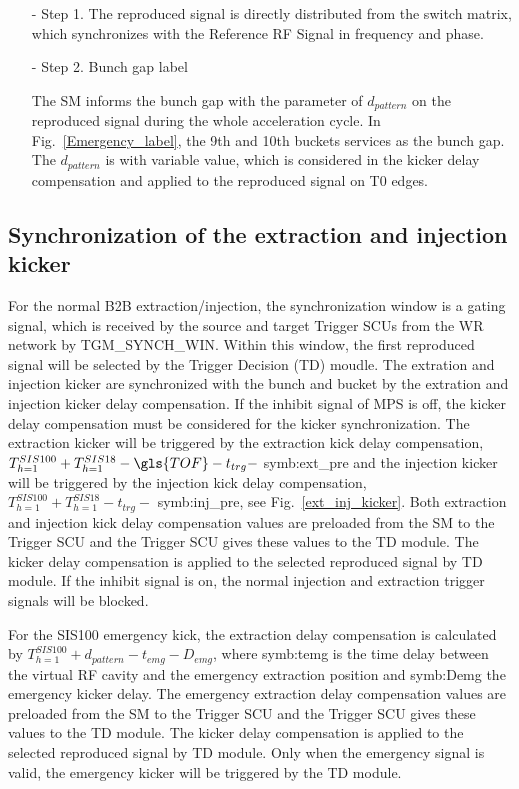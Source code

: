 \begin{itemize}
\begin{itemize}
\item[-] Step 1. The reproduced signal is directly distributed from the switch matrix, which synchronizes with the Reference RF Signal in frequency and phase.
\item[-] Step 2. Bunch gap label

The SM informs the bunch gap with the parameter of $d_{pattern}$ on the reproduced signal during the whole acceleration cycle. In Fig.~\ref{Emergency_label}, the 9th and 10th buckets services as the bunch gap. The $d_{pattern}$ is with variable value, which is considered in the kicker delay compensation and applied to the reproduced signal on T0 edges.

\end{itemize}

\end{itemize}

\subsection{Synchronization of the extraction and injection kicker}
For the normal B2B extraction/injection, the synchronization window is a gating signal, which is received by the source and target Trigger SCUs from the WR network by TGM\_SYNCH\_WIN. Within this window, the first reproduced signal will be selected by the Trigger Decision (\gls{TD}) moudle. The extration and injection kicker are synchronized with the bunch and bucket by the extration and injection kicker delay compensation. If the inhibit signal of MPS is off, the kicker delay compensation must be considered for the kicker synchronization. The extraction kicker will be triggered by the extraction kick delay compensation, $T_{h=1}^{SIS100} + T_{h=1}^{SIS18} -\gls{TOF} - t_{trg} -$ \gls{symb:ext_pre} and the injection kicker will be triggered by the injection kick delay compensation, $T_{h=1}^{SIS100} + T_{h=1}^{SIS18} - t_{trg} -$ \gls{symb:inj_pre}, see Fig.~\ref{ext_inj_kicker}. Both extraction and injection kick delay compensation values are preloaded from the SM to the Trigger SCU and the Trigger SCU gives these values to the TD module. The kicker delay compensation is applied to the selected reproduced signal by TD module. If the inhibit signal is on, the normal injection and extraction trigger signals will be blocked.

For the SIS100 emergency kick, the extraction delay compensation is calculated by $T_{h=1}^{SIS100} + d_{pattern} - t_{emg} - D_{emg}$, where \gls{symb:temg} is the time delay between the virtual RF cavity and the emergency extraction position and \gls{symb:Demg} the emergency kicker delay. The emergency extraction delay compensation values are preloaded from the SM to the Trigger SCU and the Trigger SCU gives these values to the TD module. The kicker delay compensation is applied to the selected reproduced signal by TD module. Only when the emergency signal is valid, the emergency kicker will be triggered by the TD module.


